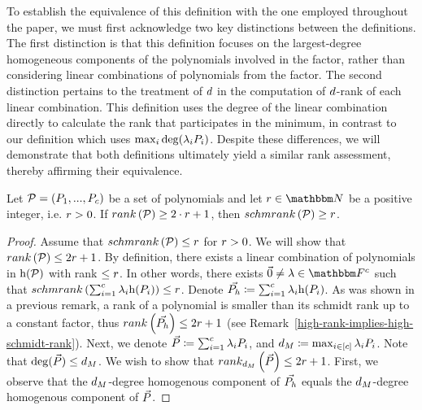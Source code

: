 To establish the equivalence of this definition with the one employed throughout the paper, we must first acknowledge two key distinctions between the definitions.
The first distinction is that this definition focuses on the largest-degree homogeneous components of the polynomials involved in the factor, rather than considering linear combinations of polynomials from the factor.
The second distinction pertains to the treatment of $d$ in the computation of $d$-rank of each linear combination.
This definition uses the degree of the linear combination directly to calculate the rank that participates in the minimum, in contrast to our definition which uses $\max_{i}{\deg(\lambda_i \genpoly_i)}$.
Despite these differences, we will demonstrate that both definitions ultimately yield a similar rank assessment, thereby affirming their equivalence.
\begin{remark}
    Let $\genpolyset = \parens{\genpoly_1,...,\genpoly_c}$ be a set of polynomials and let $\rankval \in \naturalnumbersset$ be a positive integer, i.e. ${{r}} > 0$.
    If $\rank{\genpolyset} \geq 2 \cdot \rankval + 1$, then $\schmrank{\genpolyset} \geq \rankval$.
    \begin{proof}
        Assume that $\schmrank{\genpolyset} \leq \rankval$ for ${{r}} > 0$.
        We will show that $\rank{\genpolyset} \leq 2 \rankval + 1$.
        By definition, there exists a linear combination of polynomials in $\homopart{\genpolyset}$ with rank $\leq {{r}}$.
        In other words, there exists $\vec{0} \neq \lambda \in \basefield^{c}$ such that $\schmrank{\sum_{i=1}^{c} {\lambda_i \homopart{\genpoly_i}}} \leq \rankval$.
        Denote $\vec{\genpoly_h} \definedas \sum_{i=1}^{c} {\lambda_i \homopart{\genpoly_i}} $.
        As was shown in a previous remark, a rank of a polynomial is smaller than its schmidt rank up to a constant factor,
        thus $\rank{\vec{\genpoly_h}} \leq 2\rankval + 1$ (see Remark~\ref{high-rank-implies-high-schmidt-rank}).
        \newline
        Next, we denote $\vec{\genpoly} \definedas \sum_{i=1}^{c} {\lambda_i \genpoly_i}$, and $\degree_M \definedas \max_{i \in \sparens{c}}{\lambda_i \genpoly_i}$.
        Note that  $\deg(\vec{\genpoly}) \leq \degree_M$.
        We wish to show that $\drank{\degree_M}{\vec{\genpoly}} \leq 2 \rankval + 1$.
        First, we observe that the $d_M$-degree homogenous component of $\vec{\genpoly_h}$ equals the $d_M$-degree homogenous component of $\vec{\genpoly}$.

\end{proof}
\end{remark}
